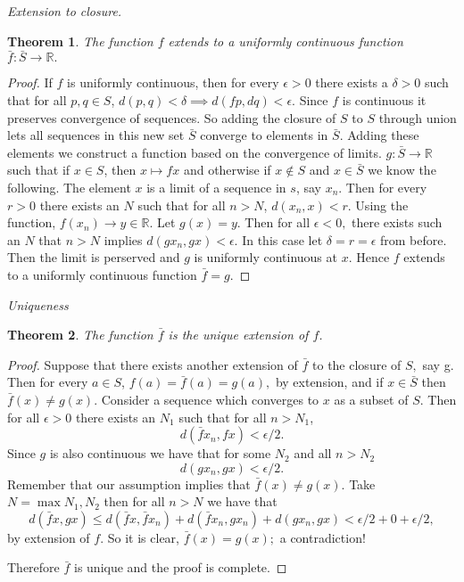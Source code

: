 \documentclass[letter]{article}
\newtheorem{theorem}{Theorem}
\newenvironment{menumerate}{%
  \edef\backupindent{\the\parindent}%
  \enumerate%
  \setlength{\parindent}{\backupindent}%
}{\endenumerate}
\begin{document}
\begin{menumerate}
			\begin{menumerate}
				\item \emph{Extension to closure.}
					\begin{theorem}
						The function $f$ extends to a uniformly continuous function $\bar f: \bar S \to \mathbb{R}.$
					\end{theorem}
					\begin{proof}
						If $f$ is uniformly continuous, then for every $\epsilon > 0$ there exists a $\delta > 0$ such that for all $p,q \in S$, $d(p,q) < \delta \implies d(fp,dq) < \epsilon.$ Since $f$ is continuous it preserves convergence of sequences. So adding the closure of $S$ to $S$ through union lets all sequences in this new set $\bar S$ converge to elements in $\bar S$. Adding these elements we construct a function based on the convergence of limits. $g : \bar S \to \mathbb{R}$  such that if $x \in S$, then $x \mapsto fx$ and otherwise if $x \notin S$ and $x \in \bar S$ we know the following. The element $x$ is a limit of a sequence in $s$, say $x_n$. Then for every $r > 0$ there exists an $N$ such that for all $n > N$, $d(x_n,x) < r.$ Using the function, $f(x_n) \to y \in \mathbb{R}$. Let $g(x) = y.$ Then for all $\epsilon < 0,$ there exists such an $N$ that $n>N$ implies $d(g x_n, g x) < \epsilon.$ In this case let $\delta = r = \epsilon$ from before. Then the limit is perserved and $g$ is uniformly continuous at $x$. Hence $f$ extends to a uniformly continuous function $\bar f = g$.
					\end{proof}

				\item \emph{Uniqueness}
					\begin{theorem}
						The function $\bar f$ is the unique extension of $f$.
					\end{theorem}
					\begin{proof}
						Suppose that there exists another extension of $\bar f$ to the closure of $S,$ say g. Then for every $a \in S$, $f(a) = \bar f(a) = g(a),$ by extension, and if $x \in \bar S$ then $\bar f(x) \neq g(x).$ Consider a sequence which converges to $x$ as a subset of $S$. Then for all $\epsilon > 0$ there exists an $N_1$ such that for all $n > N_1$, $$d(\bar fx_n, fx) < \epsilon/2.$$ Since $g$ is also continuous we have that for some $N_2$ and all $n> N_2$ $$d(gx_n,gx) < \epsilon/2.$$ Remember that our assumption implies that $\bar f(x) \neq g(x).$ Take $N = \max{N_1, N_2}$ then for all $n > N$ we have that 
						$$d(\bar fx,gx) \leq d(\bar fx, \bar fx_n) + d(\bar fx_n, gx_n) + d(gx_n, gx) < \epsilon/2 + 0 + \epsilon/2,$$
						by extension of $f.$ So it is clear, $\bar f(x) = g(x);$ a contradiction!

						Therefore $\bar f$ is unique and the proof is complete.
					\end{proof}
			\end{menumerate}

	\end{menumerate}
\end{document}
